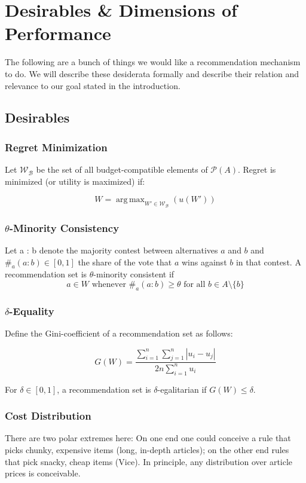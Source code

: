 \documentclass{article}
\DeclareMathOperator*{\argmax}{arg\,max}
\begin{document}
\section{Desirables \& Dimensions of Performance}\label{desirables}
The following are a bunch of things we would like a recommendation mechanism to do.
We will describe these desiderata formally and describe their relation and relevance to our goal stated in the introduction.
\subsection{Desirables}
\subsubsection{Regret Minimization}

Let $\mathcal {W_B}$ be the set of all budget-compatible elements of $\mathcal{P}(A)$. Regret is minimized (or utility is maximized) if:

\[
W=\argmax_{W'\in \mathcal{W_B}}(u(W')) 
\]


\subsubsection{$\theta$-Minority Consistency}

Let a : b denote the majority contest between alternatives $a$ and $b$ and $\#_a(a:b)\in [0,1]$ the share of the vote that $a$ wins against $b$ in that contest. A recommendation set is $\theta$-minority consistent if \[a\in W\text{ whenever } \#_a(a:b)\geq \theta \text{ for all } b\in A\setminus \{b\} \]

\subsubsection{$\delta$-Equality}

Define the Gini-coefficient of a recommendation set as follows: 

\[G(W)=\frac{\displaystyle{\sum_{i=1}^n \sum_{j=1}^n \left| u_i - u_j \right|}}{\displaystyle{2n\sum_{i=1}^n u_i}}\]

For $\delta\in [0,1]$, a recommendation set is $\delta$-egalitarian if $G(W)\leq \delta$. 

\subsubsection{Cost Distribution}

There are two polar extremes here:
On one end one could conceive a rule that picks chunky, expensive items (long, in-depth articles);
 on the other end rules that pick snacky, cheap items (Vice).
 In principle, any distribution over article prices is conceivable.
\end{document}
